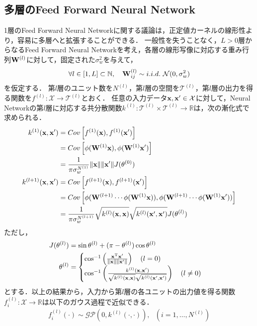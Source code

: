 \documentclass[11pt,a4j]{jarticle}
\begin{document}
    \subsection{多層のFeed Forward Neural Network}
      1層のFeed Forward Neural Networkに関する議論は，正定値カーネルの線形性より，容易に多層へと拡張することができる．
      一般性を失うことなく，$L > 0$層からなるFeed Forward Neural Networkを考え，各層の線形写像に対応する重み行列${\bf W}^{(l)}$に対して，固定された$\sigma^2_w$を与えて，
      \begin{align}
        \forall l \in [1, L] \subset \mathbb{N}, ~~~ {\bf W}^{(l)}_{ij} \sim i.i.d. ~ \mathcal{N}(0, \sigma^2_w)
      \end{align}
      を仮定する．
      第$l$層のユニット数を$N^{(l)}$，第$l$層の空間を$\mathcal{T}^{(l)}$，第$l$層の出力を得る関数を$f^{(l)}: \mathcal{X} \to \mathcal{T}^{(l)}$とおく．
      任意の入力データ${\bf x}, {\bf x}' \in \mathcal{X}$に対して，Neural Networkの第$l$層に対応する共分散関数$k^{(l)}: \mathcal{T}^{(l)} \times \mathcal{T}^{(l)} \to \mathbb{R}$は，次の漸化式で求められる．
      \begin{align}
        k^{(1)}({\bf x}, {\bf x}') &= Cov \left[ f^{(1)}({\bf x}), f^{(1)}({\bf x}') \right] \nonumber \\
                                   &= Cov \left[ \phi({\bf W}^{(1)} {\bf x}), \phi({\bf W}^{(1)} {\bf x}') \right] \nonumber \\ 
                                   &= \frac{1}{\pi \sigma_w^{N^{(1)}}} \| {\bf x} \| \| {\bf x}' \| J(\theta^{(0)}) \\
        k^{(l+1)}({\bf x}, {\bf x}') &= Cov \left[ f^{(l+1)}({\bf x}), f^{(l+1)}({\bf x}') \right] \nonumber \\
                                     &= Cov \left[ \phi( {\bf W}^{(l+1)} \cdots \phi( {\bf W}^{(1)} {\bf x} )), \phi( {\bf W}^{(l+1)} \cdots \phi( {\bf W}^{(1)} {\bf x}' )) \right] \nonumber \\ 
                                     &= \frac{1}{ \pi \sigma_{w}^{ N^{(l+1)}}} \sqrt{ k^{(l)}({\bf x}, {\bf x}) } \sqrt{ k^{(l)}({\bf x}', {\bf x}') } J(\theta^{(l)})
      \end{align}
      ただし，
      \begin{align}
        J(\theta^{(l)}) &= \sin \theta^{(l)} + (\pi - \theta^{(l)}) \cos \theta^{(l)} \\
        \theta^{(l)} &=
        \begin{cases}
          \cos^{-1} \left( \frac{{\bf x}^{\mathrm{T}} {\bf x}'}{ \|{\bf x}\| \|{\bf x}'\| } \right) ~~~ (l = 0) \\
          \cos^{-1} \left( \frac{k^{(l)}( {\bf x}, {\bf x}' )}{ \sqrt{ k^{(l)}({\bf x}, {\bf x}) } \sqrt{ k^{(l)}({\bf x}', {\bf x}') } } \right) ~~~ (l \neq 0) 
        \end{cases}
      \end{align}
      とする．以上の結果から，入力から第$l$層の各ユニットの出力値を得る関数$f^{(l)}_i: \mathcal{X} \to \mathbb{R}$は以下のガウス過程で近似できる．
      \begin{align}
        f^{(l)}_i(\cdot) \sim \mathcal{GP}( 0, k^{(l)}(\cdot,\cdot) ), ~~~ (i=1,\dots,N^{(l)})
      \end{align}
\end{document}

